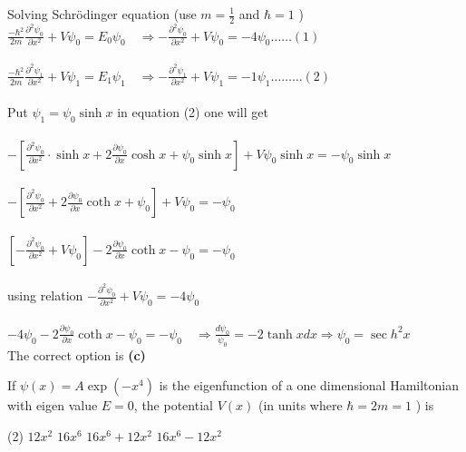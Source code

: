 \begin{enumerate}
\begin{answer}
	Solving Schrödinger equation (use $m=\frac{1}{2}$ and $\hbar=1$ )\\
	$\frac{-\hbar^{2}}{2 m} \frac{\partial^{2} \psi_{0}}{\partial x^{2}}+V \psi_{0}=E_{0} \psi_{0} \quad \Rightarrow-\frac{\partial^{2} \psi_{0}}{\partial x^{2}}+V \psi_{0}=-4 \psi_{0} \ldots \ldots(1)$\\\\
	$\frac{-\hbar^{2}}{2 m} \frac{\partial^{2} \psi_{1}}{\partial x^{2}}+V \psi_{1}=E_{1} \psi_{1} \quad \Rightarrow-\frac{\partial^{2} \psi_{1}}{\partial x^{2}}+V \psi_{1}=-1 \psi_{1} \ldots \ldots \ldots(2)$\\\\
	Put $\psi_{1}=\psi_{0} \sinh x$ in equation (2) one will get\\\\
	$-\left[\frac{\partial^{2} \psi_{0}}{\partial x^{2}} \cdot \sinh x+2 \frac{\partial \psi_{0}}{\partial x} \cosh x+\psi_{0} \sinh x\right]+V \psi_{0} \sinh x=-\psi_{0} \sinh x$\\\\
	$-\left[\frac{\partial^{2} \psi_{0}}{\partial x^{2}}+2 \frac{\partial \psi_{0}}{\partial x} \operatorname{coth} x+\psi_{0}\right]+V \psi_{0}=-\psi_{0}$\\\\
	$\left[-\frac{\partial^{2} \psi_{0}}{\partial x^{2}}+V \psi_{0}\right]-2 \frac{\partial \psi_{0}}{\partial x} \operatorname{coth} x-\psi_{0}=-\psi_{0}$\\\\
	 using relation $-\frac{\partial^{2} \psi_{0}}{\partial x^{2}}+V \psi_{0}=-4 \psi_{0}$\\\\
	$-4 \psi_{0}-2 \frac{\partial \psi_{0}}{\partial x} \operatorname{coth} x-\psi_{0}=-\psi_{0} \quad \Rightarrow \frac{d \psi_{0}}{\psi_{0}}=-2 \tanh x d x \Rightarrow \psi_{0}=\sec h^{2} x$\\
	The correct option is \textbf{(c)}
\end{answer}
\begin{minipage}{\textwidth}
	\item If $\psi(x)=A \exp \left(-x^{4}\right)$ is the eigenfunction of a one dimensional Hamiltonian with eigen value $E=0$, the potential $V(x)$ (in units where $\hbar=2 m=1$ ) is
\end{minipage}
\begin{tasks}(2)
	\task[\textbf{A.}] $12 x^{2}$
	\task[\textbf{B.}]$16 x^{6}$
	\task[\textbf{C.}]$16 x^{6}+12 x^{2}$
	\task[\textbf{D.}]$16 x^{6}-12 x^{2}$

\end{tasks}
\end{enumerate}

